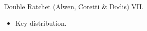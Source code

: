 \documentclass{beamer}
\begin{document}
\begin{frame}{Double Ratchet (Alwen, Coretti \& Dodis) VII.}
  \scriptsize
   \begin{minipage}[h]{0.49\textwidth}
      \begin{figure}[h]
        \centering
        \setlength{\fboxsep}{10pt}
        \scalebox{0.7}{%
        \fbox{%
          
        }
      }
    \end{figure}
    \end{minipage}
   \begin{minipage}[h]{0.49\textwidth}
      \begin{itemize}
      \item Key distribution.
      \end{itemize}
  \end{minipage}
\end{frame}
\end{document}
